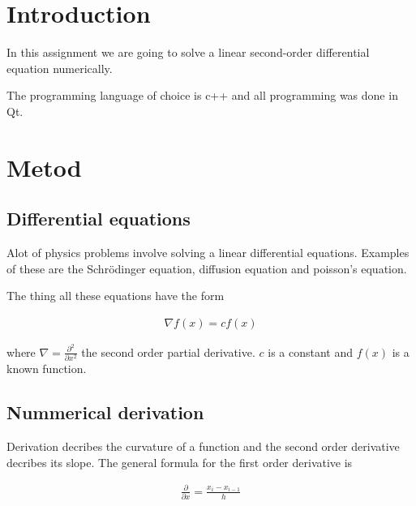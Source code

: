 \documentclass[11pt,twoside,a4paper]{article}
\newcommand{\nl}{

\medskip
\noindent

}
\begin{document}


\section*{Introduction}

In this assignment we are going to solve a linear second-order differential equation numerically.
\nl
The programming language of choice is c++ and all programming was done in Qt.

\section*{Metod}
\subsection*{Differential equations}

Alot of physics problems involve solving a linear differential equations. Examples of these are the Schrödinger equation, diffusion equation and poisson's equation.
\nl
The thing all these equations have the form 

\begin{align*}
\nabla f(x) = cf(x)
\end{align*}

where $\nabla = \frac{\partial^2}{\partial x^2}$ the second order partial derivative. $c$ is a constant and $f(x)$ is a known function.

\subsection*{Nummerical derivation}

Derivation decribes the curvature of a function and the second order derivative decribes its slope. The general formula for the first order derivative is

\begin{align*}
\frac{\partial}{\partial x} = \frac{x_i - x_{i-1}}{h}
\end{align*}
\end{document}
